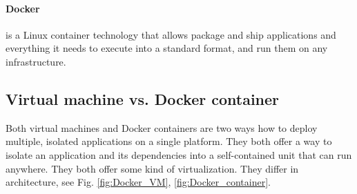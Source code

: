 \paragraph{Docker} is a Linux container technology that allows package and ship applications and everything it needs to execute into a standard
format, and run them on any infrastructure.

\subsection{Virtual machine vs. Docker container}
Both virtual machines and Docker containers are two ways how to deploy multiple, isolated applications on a single platform. They
both offer a way to isolate an application and its dependencies into a self-contained unit that can run anywhere. They both offer
some kind of virtualization. They differ in architecture, see Fig. \ref{fig:Docker_VM}, \ref{fig:Docker_container}.

\begin{figure}[h!]
\centering
\begin{floatrow}
\end{floatrow}
\end{figure}

